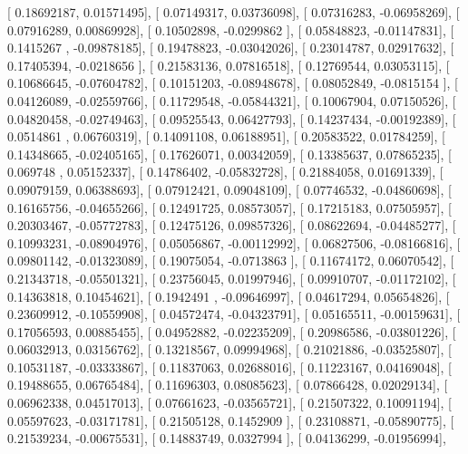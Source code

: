 \documentclass{article}
\begin{document}
       [ 0.18692187,  0.01571495],
       [ 0.07149317,  0.03736098],
       [ 0.07316283, -0.06958269],
       [ 0.07916289,  0.00869928],
       [ 0.10502898, -0.0299862 ],
       [ 0.05848823, -0.01147831],
       [ 0.1415267 , -0.09878185],
       [ 0.19478823, -0.03042026],
       [ 0.23014787,  0.02917632],
       [ 0.17405394, -0.0218656 ],
       [ 0.21583136,  0.07816518],
       [ 0.12769544,  0.03053115],
       [ 0.10686645, -0.07604782],
       [ 0.10151203, -0.08948678],
       [ 0.08052849, -0.0815154 ],
       [ 0.04126089, -0.02559766],
       [ 0.11729548, -0.05844321],
       [ 0.10067904,  0.07150526],
       [ 0.04820458, -0.02749463],
       [ 0.09525543,  0.06427793],
       [ 0.14237434, -0.00192389],
       [ 0.0514861 ,  0.06760319],
       [ 0.14091108,  0.06188951],
       [ 0.20583522,  0.01784259],
       [ 0.14348665, -0.02405165],
       [ 0.17626071,  0.00342059],
       [ 0.13385637,  0.07865235],
       [ 0.069748  ,  0.05152337],
       [ 0.14786402, -0.05832728],
       [ 0.21884058,  0.01691339],
       [ 0.09079159,  0.06388693],
       [ 0.07912421,  0.09048109],
       [ 0.07746532, -0.04860698],
       [ 0.16165756, -0.04655266],
       [ 0.12491725,  0.08573057],
       [ 0.17215183,  0.07505957],
       [ 0.20303467, -0.05772783],
       [ 0.12475126,  0.09857326],
       [ 0.08622694, -0.04485277],
       [ 0.10993231, -0.08904976],
       [ 0.05056867, -0.00112992],
       [ 0.06827506, -0.08166816],
       [ 0.09801142, -0.01323089],
       [ 0.19075054, -0.0713863 ],
       [ 0.11674172,  0.06070542],
       [ 0.21343718, -0.05501321],
       [ 0.23756045,  0.01997946],
       [ 0.09910707, -0.01172102],
       [ 0.14363818,  0.10454621],
       [ 0.1942491 , -0.09646997],
       [ 0.04617294,  0.05654826],
       [ 0.23609912, -0.10559908],
       [ 0.04572474, -0.04323791],
       [ 0.05165511, -0.00159631],
       [ 0.17056593,  0.00885455],
       [ 0.04952882, -0.02235209],
       [ 0.20986586, -0.03801226],
       [ 0.06032913,  0.03156762],
       [ 0.13218567,  0.09994968],
       [ 0.21021886, -0.03525807],
       [ 0.10531187, -0.03333867],
       [ 0.11837063,  0.02688016],
       [ 0.11223167,  0.04169048],
       [ 0.19488655,  0.06765484],
       [ 0.11696303,  0.08085623],
       [ 0.07866428,  0.02029134],
       [ 0.06962338,  0.04517013],
       [ 0.07661623, -0.03565721],
       [ 0.21507322,  0.10091194],
       [ 0.05597623, -0.03171781],
       [ 0.21505128,  0.1452909 ],
       [ 0.23108871, -0.05890775],
       [ 0.21539234, -0.00675531],
       [ 0.14883749,  0.0327994 ],
       [ 0.04136299, -0.01956994],
\end{document}
